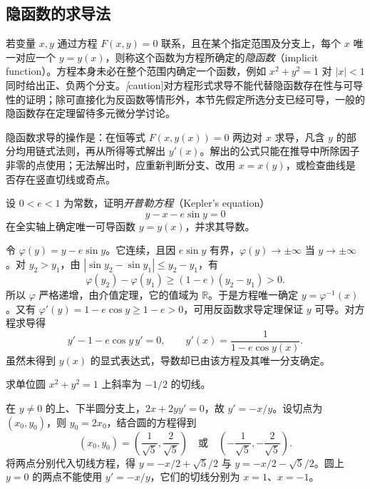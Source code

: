\subsection{隐函数的求导法}
\label{subsec:implicit-differentiation}

若变量 $x,y$ 通过方程 $F(x,y)=0$ 联系，且在某个指定范围及分支上，每个 $x$ 唯一对应一个 $y=y(x)$，则称这个函数为方程所确定的\emph{隐函数}（implicit function）。方程本身未必在整个范围内确定一个函数，例如 $x^2+y^2=1$ 对 $|x|<1$ 同时给出正、负两个分支。\emph[caution]{对方程形式求导不能代替隐函数存在性与可导性的证明}；除可直接化为反函数等情形外，本节先假定所选分支已经可导，一般的隐函数存在定理留待多元微分学讨论。

隐函数求导的操作是：在恒等式 $F(x,y(x))=0$ 两边对 $x$ 求导，凡含 $y$ 的部分均用链式法则，再从所得等式解出 $y'(x)$。解出的公式只能在推导中所除因子非零的点使用；无法解出时，应重新判断分支、改用 $x=x(y)$，或检查曲线是否存在竖直切线或奇点。

\begin{example}
\label{ex:kepler-equation-implicit-derivative}
设 $0<e<1$ 为常数，证明\emph{开普勒方程}（Kepler's equation）
\[
    y-x-e\sin y=0
\]
在全实轴上确定唯一可导函数 $y=y(x)$，并求其导数。
\end{example}
\begin{solve}
令 $\varphi(y)=y-e\sin y$。它连续，且因 $e\sin y$ 有界，$\varphi(y)\to\pm\infty$ 当 $y\to\pm\infty$。对 $y_2>y_1$，由 $|\sin y_2-\sin y_1|\leq y_2-y_1$，有
\[
    \varphi(y_2)-\varphi(y_1)
    \geq(1-e)(y_2-y_1)>0.
\]
所以 $\varphi$ 严格递增，由介值定理，它的值域为 $\mathbb R$。于是方程唯一确定 $y=\varphi^{-1}(x)$。又有 $\varphi'(y)=1-e\cos y\geq1-e>0$，可用反函数求导定理保证 $y$ 可导。对方程求导得
\[
    y'-1-e\cos y\,y'=0,
    \qquad y'(x)=\frac1{1-e\cos y(x)}.
\]
虽然未得到 $y(x)$ 的显式表达式，导数却已由该方程及其唯一分支确定。
\end{solve}

\begin{example}
\label{ex:circle-tangents-by-implicit-differentiation}
求单位圆 $x^2+y^2=1$ 上斜率为 $-1/2$ 的切线。
\end{example}
\begin{solve}
在 $y\ne0$ 的上、下半圆分支上，$2x+2yy'=0$，故 $y'=-x/y$。设切点为 $(x_0,y_0)$，则 $y_0=2x_0$，结合圆的方程得到
\[
    (x_0,y_0)=\left(\frac1{\sqrt5},\frac2{\sqrt5}\right)
    \quad\text{或}\quad
    \left(-\frac1{\sqrt5},-\frac2{\sqrt5}\right).
\]
将两点分别代入切线方程，得 $y=-x/2+\sqrt5/2$ 与 $y=-x/2-\sqrt5/2$。圆上 $y=0$ 的两点不能使用 $y'=-x/y$，它们的切线分别为 $x=1$、$x=-1$。
\end{solve}

